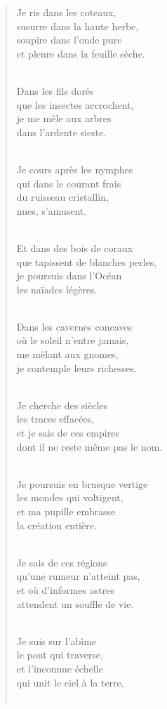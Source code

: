 \documentclass[a4paper,11pt]{book}
\begin{document}
\begin{verse}
Je ris dans les coteaux, \\
susurre dans la haute herbe, \\
soupire dans l'onde pure \\
et pleure dans la feuille sèche. \\ \

\bigskip 

Dans les fils dorés \\
que les insectes accrochent, \\
je me mêle aux arbres \\
dans l'ardente sieste. \\ \

Je cours après les nymphes \\
qui dans le courant frais \\
du ruisseau cristallin, \\
nues, s'amusent. \\ \

Et dans des bois de coraux \\
que tapissent de blanches perles, \\
je poursuis dans l'Océan \\
les naïades légères. \\ \

Dans les cavernes concaves \\
où le soleil n'entre jamais, \\
me mêlant aux gnomes, \\
je contemple leurs richesses. \\ \

Je cherche des siècles \\
les traces effacées, \\
et je sais de ces empires \\
dont il ne reste même pas le nom. \\ \

Je poursuis en brusque vertige \\
les mondes qui voltigent, \\
et ma pupille embrasse \\
la création entière. \\ \

Je sais de ces régions \\
qu'une rumeur n'atteint pas, \\
et où d'informes astres \\
attendent un souffle de vie. \\ \

Je suis sur l'abîme \\
le pont qui traverse, \\
et l'inconnue échelle \\
qui unit le ciel à la terre. \\ \


\end{verse}
\end{document}
